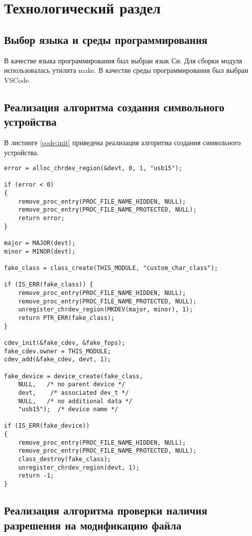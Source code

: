 \chapter{Технологический раздел}
\label{cha:impl}

\section{Выбор языка и среды программирования}

В качестве языка программирования был выбран язык Си. Для сборки модуля использовалась утилита make. В качестве среды программирования был выбран VSCode.

\section{Реализация алгоритма создания символьного устройства}

В листинге \ref{code:init} приведена реализация алгоритма создания символьного устройства.

\begin{lstlisting}[label=code:init,caption=Реализация алгоритма создания символьного устройства]
error = alloc_chrdev_region(&devt, 0, 1, "usb15");

if (error < 0)
{
	remove_proc_entry(PROC_FILE_NAME_HIDDEN, NULL);
	remove_proc_entry(PROC_FILE_NAME_PROTECTED, NULL);
	return error;
}

major = MAJOR(devt);
minor = MINOR(devt);

fake_class = class_create(THIS_MODULE, "custom_char_class");

if (IS_ERR(fake_class)) {
	remove_proc_entry(PROC_FILE_NAME_HIDDEN, NULL);
	remove_proc_entry(PROC_FILE_NAME_PROTECTED, NULL);
	unregister_chrdev_region(MKDEV(major, minor), 1);
	return PTR_ERR(fake_class);
}

cdev_init(&fake_cdev, &fake_fops);
fake_cdev.owner = THIS_MODULE;
cdev_add(&fake_cdev, devt, 1);

fake_device = device_create(fake_class,
	NULL,   /* no parent device */
	devt,    /* associated dev_t */
	NULL,   /* no additional data */
	"usb15");  /* device name */

if (IS_ERR(fake_device))
{
	remove_proc_entry(PROC_FILE_NAME_HIDDEN, NULL);
	remove_proc_entry(PROC_FILE_NAME_PROTECTED, NULL);
	class_destroy(fake_class);
	unregister_chrdev_region(devt, 1);
	return -1;
}
\end{lstlisting}

\section{Реализация алгоритма проверки наличия разрешения на модификацию файла}

